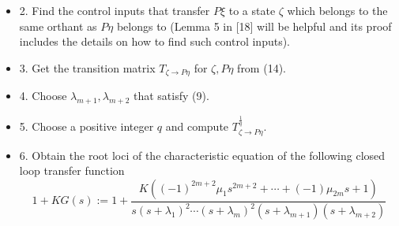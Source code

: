 \documentclass[journal,a4paper,12pt,onecolumn]{IEEEtran}
\begin{document}
\begin{itemize}
\item 2. Find the control inputs that transfer $P\xi $ to a state $\zeta $
which belongs to the same orthant as $P\eta $ belongs to (Lemma 5 in [18]
will be helpful and its proof includes the details on how to find such
control inputs).

\item 3. Get the transition matrix $T_{\zeta \rightarrow P\eta }$ for $\zeta
,P\eta $ from (14).

\item 4. Choose $\lambda _{m+1},\lambda _{m+2}$ that satisfy (9).

\item 5. Choose a positive integer $q$ and compute $T_{\zeta \rightarrow
P\eta }^{\frac{1}{q}}$.

\item 6. Obtain the root loci of the characteristic equation of the
following closed loop transfer function\begin{equation}
1+KG\left( s\right) :=1+\frac{K\left( \left( -1\right) ^{2m+2}\mu
_{1}s^{2m+2}+\cdots +\left( -1\right) \mu _{2m}s+1\right) }{s\left(
s+\lambda _{1}\right) ^{2}\cdots \left( s+\lambda _{m}\right) ^{2}\left(
s+\lambda _{m+1}\right) \left( s+\lambda _{m+2}\right) }
\end{equation}


\end{itemize}
\end{document}
